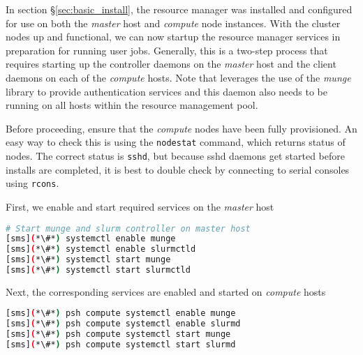 In section \S\ref{sec:basic_install}, the \SLURM{} resource manager was installed
and configured for use on both the {\em master} host and {\em compute} node
instances. With the cluster nodes up and functional, we can now startup the
resource manager services in preparation for running user jobs. Generally, this
is a two-step process that requires starting up the controller daemons on the {\em
 master} host and the client daemons on each of the {\em compute} hosts.
Note that \SLURM{} leverages the use of the {\em munge} library to provide
authentication services and this daemon also needs to be running on all hosts
within the resource management pool. 

Before proceeding, ensure that the {\em compute} nodes have been fully
provisioned. An easy way to check this is using the \texttt{nodestat} command,
which returns status of nodes. The correct status is \texttt{sshd}, but because
sshd daemons get started before installs are completed, it is best to double
check by connecting to serial consoles using \texttt{rcons}.   


First, we enable and start required services on the {\em master} host

\begin{lstlisting}[language=bash,keywords={}]
# Start munge and slurm controller on master host
[sms](*\#*) systemctl enable munge
[sms](*\#*) systemctl enable slurmctld
[sms](*\#*) systemctl start munge
[sms](*\#*) systemctl start slurmctld
\end{lstlisting}

Next, the corresponding services are enabled and started on {\em compute} hosts

\begin{lstlisting}[language=bash,keywords={}]
[sms](*\#*) psh compute systemctl enable munge
[sms](*\#*) psh compute systemctl enable slurmd
[sms](*\#*) psh compute systemctl start munge
[sms](*\#*) psh compute systemctl start slurmd
\end{lstlisting}


